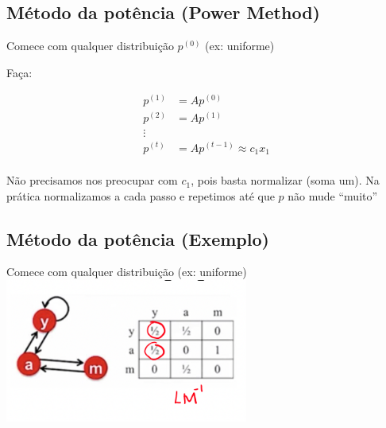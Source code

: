 \documentclass[
  letterpaper,
  DIV=11,
  numbers=noendperiod]{scrartcl}
\begin{document}
\hypertarget{muxe9todo-da-potuxeancia-power-method}{%
\subsection{Método da potência (Power
Method)}\label{muxe9todo-da-potuxeancia-power-method}}

Comece com qualquer distribuição \(p^{(0)}\) (ex: uniforme)

Faça:

\begin{align}
p^{(1)} &= Ap^{(0)}\\
p^{(2)} &= Ap^{(1)}\\
\vdots\\
p^{(t)} &= Ap^{(t-1)}\approx c_1x_1\\
\end{align}

\begin{tcolorbox}[enhanced jigsaw, colbacktitle=quarto-callout-note-color!10!white, colframe=quarto-callout-note-color-frame, opacityback=0, breakable, toprule=.15mm, leftrule=.75mm, titlerule=0mm, coltitle=black, bottomtitle=1mm, colback=white, toptitle=1mm, title=\textcolor{quarto-callout-note-color}{\faInfo}\hspace{0.5em}{Note}, arc=.35mm, rightrule=.15mm, bottomrule=.15mm, left=2mm, opacitybacktitle=0.6]
Não precisamos nos preocupar com \(c_1\), pois basta normalizar (soma
um). Na prática normalizamos a cada passo e repetimos até que \(p\) não
mude ``muito''
\end{tcolorbox}

\hypertarget{muxe9todo-da-potuxeancia-exemplo}{%
\subsection{Método da potência
(Exemplo)}\label{muxe9todo-da-potuxeancia-exemplo}}

Comece com qualquer distribuição (ex: uniforme)
\includegraphics[width=0.6\textwidth,height=\textheight]{figs/Aula09/ex_metodo_potencia.png}
\end{document}
